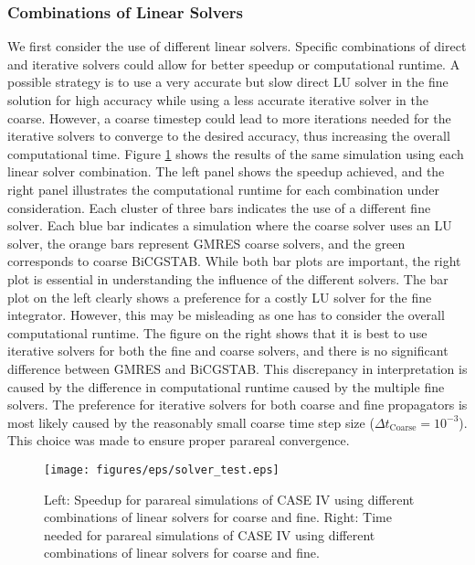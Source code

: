 \subsubsection{Combinations of Linear Solvers}
\label{sec: comb lin solv}
We first consider the use of different linear solvers. Specific combinations of direct and iterative solvers could allow for better speedup or computational runtime. A possible strategy is to use a very accurate but slow direct LU solver in the fine solution for high accuracy while using a less accurate iterative solver in the coarse. However, a coarse timestep could lead to more iterations needed for the iterative solvers to converge to the desired accuracy, thus increasing the overall computational time. Figure \ref{fig: linear solver combination} shows the results of the same simulation using each linear solver combination. The left panel shows the speedup achieved, and the right panel illustrates the computational runtime for each combination under consideration. Each cluster of three bars indicates the use of a different fine solver. Each blue bar indicates a simulation where the coarse solver uses an LU solver, the orange bars represent GMRES coarse solvers, and the green corresponds to coarse BiCGSTAB. While both bar plots are important, the right plot is essential in understanding the influence of the different solvers. The bar plot on the left clearly shows a preference for a costly LU solver for the fine integrator. However, this may be misleading as one has to consider the overall computational runtime. The figure on the right shows that it is best to use iterative solvers for both the fine and coarse solvers, and there is no significant difference between GMRES and BiCGSTAB. This discrepancy in interpretation is caused by the difference in computational runtime caused by the multiple fine solvers. The preference for iterative solvers for both coarse and fine propagators is most likely caused by the reasonably small coarse time step size ($\Delta t_\mathrm{Coarse} = 10^{-3}$). This choice was made to ensure proper parareal convergence. 
  \begin{figure}[h]
    \centering
    \texttt{[image: figures/eps/solver\_test.eps]}
    \caption{Left: Speedup for parareal simulations of CASE IV using different combinations of linear solvers for coarse and fine. Right: Time needed for parareal simulations of CASE IV using different combinations of linear solvers for coarse and fine.}
    \label{fig: linear solver combination}
\end{figure}

